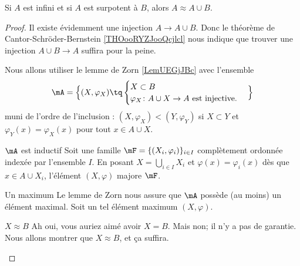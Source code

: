 \begin{lemma}       \label{LEMooXMVDooIWLWis}
    Si \( A\) est infini et si \( A\) est surpotent à \( B\), alors \( A\approx A\cup B\).
\end{lemma}

\begin{proof}
    Il existe évidemment une injection \( A\to A\cup B\). Donc le théorème de Cantor-Schröder-Bernstein \ref{THOooRYZJooQcjlcl} nous indique que trouver une injection \( A\cup B\to A\) suffira pour la peine.

    Nous allons utiliser le lemme de Zorn \ref{LemUEGjJBc} avec l'ensemble
    \begin{equation}
       \mA=\Big\{  (X,\varphi_X)  \tq
        \begin{cases}
            X\subset B\\
            \varphi_X\colon A\cup X\to A\text{ est injective.}
        \end{cases}
    \Big\}
    \end{equation}
    muni de l'ordre de l'inclusion : \( (X,\varphi_X)<(Y,\varphi_Y)\) si \( X\subset Y\) et \( \varphi_Y(x)=\varphi_X(x)\) pour tout \( x\in A\cup X\).
    
    \begin{subproof}
        \item[\( \mA\) est inductif]
            Soit une famille \( \mF=\{ (X_i,\varphi_i) \}_{i\in I}\) complètement ordonnée indexée par l'ensemble \( I\). En posant \( X=\bigcup_{i\in I}X_i\) et \( \varphi(x)=\varphi_i(x)\) dès que \( x\in A\cup X_i\), l'élément \( (X,\varphi)\) majore \( \mF\).
        \item[Un maximum]
            Le lemme de Zorn nous assure que \( \mA\) possède (au moins) un élément maximal. Soit un tel élément maximum \( (X,\varphi)\). 
        \item[\( X\approx B\)]
            Ah oui, vous auriez aimé avoir \( X=B\). Mais non; il n'y a pas de garantie. Nous allons montrer que \( X\approx B\), et ça suffira.


\end{subproof}
\end{proof}
